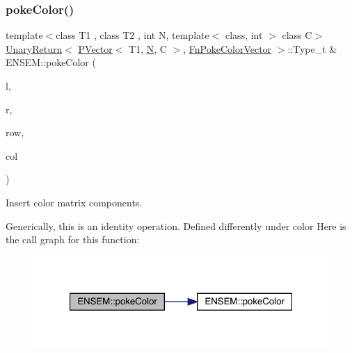 \subsubsection{\texorpdfstring{pokeColor()}{pokeColor()}\hspace{0.1cm}{\footnotesize\ttfamily [2/2]}}
{\footnotesize\ttfamily template$<$class T1 , class T2 , int N, template$<$ class, int $>$ class C$>$ \\
\mbox{\hyperlink{structENSEM_1_1UnaryReturn}{Unary\+Return}}$<$ \mbox{\hyperlink{classENSEM_1_1PVector}{P\+Vector}}$<$ T1, \mbox{\hyperlink{operator__name__util_8cc_a7722c8ecbb62d99aee7ce68b1752f337}{N}}, C $>$, \mbox{\hyperlink{structENSEM_1_1FnPokeColorVector}{Fn\+Poke\+Color\+Vector}} $>$\+::Type\+\_\+t \& E\+N\+S\+E\+M\+::poke\+Color (\begin{DoxyParamCaption}\item[{\mbox{\hyperlink{classENSEM_1_1PVector}{P\+Vector}}$<$ T1, \mbox{\hyperlink{operator__name__util_8cc_a7722c8ecbb62d99aee7ce68b1752f337}{N}}, C $>$ \&}]{l,  }\item[{const \mbox{\hyperlink{classENSEM_1_1PVector}{P\+Vector}}$<$ T2, \mbox{\hyperlink{operator__name__util_8cc_a7722c8ecbb62d99aee7ce68b1752f337}{N}}, C $>$ \&}]{r,  }\item[{int}]{row,  }\item[{int}]{col }\end{DoxyParamCaption})\hspace{0.3cm}{\ttfamily [inline]}}



Insert color matrix components. 

Generically, this is an identity operation. Defined differently under color Here is the call graph for this function\+:\nopagebreak
\begin{figure}[H]
\begin{center}
\leavevmode
\includegraphics[width=321pt]{d3/dc4/group__primvector_ga756245fd2f8bde2eab2ef42e08578af6_cgraph}
\end{center}
\end{figure}
\mbox{\label{group__primvector_ga10934b73afbfb3796cad8a1208d7ab1d}} 
